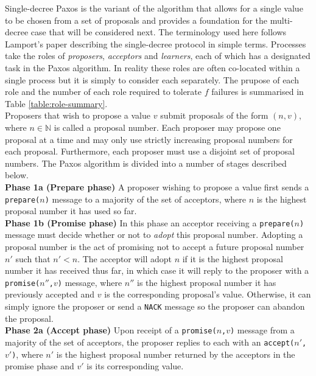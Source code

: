 Single-decree Paxos is the variant of the algorithm that allows for a single value to be chosen from a set of proposals and provides a foundation for the multi-decree case that will be considered next. The terminology used here follows Lamport's paper \cite{paxos-made-simple} describing the single-decree protocol in simple terms. Processes take the roles of \emph{proposers}, \emph{acceptors} and \emph{learners}, each of which has a designated task in the Paxos algorithm. In reality these roles are often co-located within a single process but it is simply to consider each separately.  The prupose of each role and the number of each role required to tolerate $f$ failures is summarised in Table \ref{table:role-summary}.  \\

Proposers that wish to propose a value $v$ submit proposals of the form $\left(n,v\right)$, where $n \in \mathbb{N}$ is called a proposal number. Each proposer may propose one proposal at a time and may only use strictly increasing proposal numbers for each proposal. Furthermore, each proposer must use a disjoint set of proposal numbers. The Paxos algorithm is divided into a number of stages described below. \\

\textbf{Phase 1a (Prepare phase)} A proposer wishing to propose a value first sends a \texttt{prepare($n$)} message to a majority of the set of acceptors, where $n$ is the highest proposal number it has used so far. \\

\textbf{Phase 1b (Promise phase)} In this phase an acceptor receiving a \texttt{prepare($n$)} message must decide whether or not to \emph{adopt} this proposal number. Adopting a proposal number is the act of promising not to accept a future proposal number $n'$ such that $n' < n$. The acceptor will adopt $n$ if it is the highest proposal number it has received thus far, in which case it will reply to the proposer with a \texttt{promise($n''$,$v$)} message, where $n''$ is the highest proposal number it has previously accepted and $v$ is the corresponding proposal's value. Otherwise, it can simply ignore the proposer or send a \texttt{NACK} message so the proposer can abandon the proposal. \\

\textbf{Phase 2a (Accept phase)} Upon receipt of a \texttt{promise($n$,$v$)} message from a majority of the set of acceptors, the proposer replies to each with an \texttt{accept($n'$,$v'$)}, where $n'$ is the highest proposal number returned by the acceptors in the promise phase and $v'$ is its corresponding value. \\

